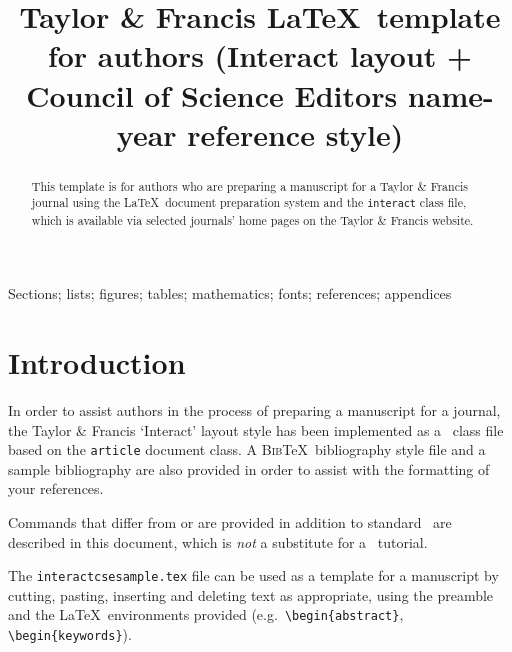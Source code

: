 \documentclass[]{interact}
\theoremstyle{plain}%
\theoremstyle{definition}
\theoremstyle{remark}
\begin{document}

\title{Taylor \& Francis \LaTeX\ template for authors (\textsf{Interact} layout + Council of Science Editors name-year reference style)}

\author{
}

\maketitle

\begin{abstract}
This template is for authors who are preparing a manuscript for a Taylor \& Francis journal using the \LaTeX\ document preparation system and the \texttt{interact} class file, which is available via selected journals' home pages on the Taylor \& Francis website.
\end{abstract}

\begin{keywords}
Sections; lists; figures; tables; mathematics; fonts; references; appendices
\end{keywords}


\section{Introduction}

In order to assist authors in the process of preparing a manuscript for a journal, the Taylor \& Francis `\textsf{Interact}' layout style has been implemented as a \LaTeXe\ class file based on the \texttt{article} document class. A \textsc{Bib}\TeX\ bibliography style file and a sample bibliography are also provided in order to assist with the formatting of your references.

Commands that differ from or are provided in addition to standard \LaTeXe\ are described in this document, which is \emph{not} a substitute for a \LaTeXe\ tutorial.

The \texttt{interactcsesample.tex} file can be used as a template for a manuscript by cutting, pasting, inserting and deleting text as appropriate, using the preamble and the \LaTeX\ environments provided (e.g.\ \verb"\begin{abstract}", \verb"\begin{keywords}").
\end{document}
